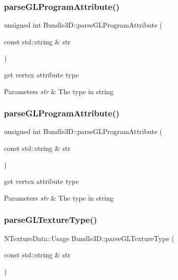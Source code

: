 \subsubsection{\texorpdfstring{parse\+G\+L\+Program\+Attribute()}{parseGLProgramAttribute()}\hspace{0.1cm}{\footnotesize\ttfamily [1/2]}}
{\footnotesize\ttfamily unsigned int Bundle3\+D\+::parse\+G\+L\+Program\+Attribute (\begin{DoxyParamCaption}\item[{const std\+::string \&}]{str }\end{DoxyParamCaption})\hspace{0.3cm}{\ttfamily [protected]}}

get vertex attribute type 
\begin{DoxyParams}{Parameters}
{\em str} & The type in string \\
\hline
\end{DoxyParams}
\mbox{\label{classBundle3D_a0a7ca57fdb38995fa753d07beffb7501}} 
\subsubsection{\texorpdfstring{parse\+G\+L\+Program\+Attribute()}{parseGLProgramAttribute()}\hspace{0.1cm}{\footnotesize\ttfamily [2/2]}}
{\footnotesize\ttfamily unsigned int Bundle3\+D\+::parse\+G\+L\+Program\+Attribute (\begin{DoxyParamCaption}\item[{const std\+::string \&}]{str }\end{DoxyParamCaption})\hspace{0.3cm}{\ttfamily [protected]}}

get vertex attribute type 
\begin{DoxyParams}{Parameters}
{\em str} & The type in string \\
\hline
\end{DoxyParams}
\mbox{\label{classBundle3D_a467d6b0c572920193acd43365a7300d2}} 
\subsubsection{\texorpdfstring{parse\+G\+L\+Texture\+Type()}{parseGLTextureType()}\hspace{0.1cm}{\footnotesize\ttfamily [1/2]}}
{\footnotesize\ttfamily N\+Texture\+Data\+::\+Usage Bundle3\+D\+::parse\+G\+L\+Texture\+Type (\begin{DoxyParamCaption}\item[{const std\+::string \&}]{str }\end{DoxyParamCaption})\hspace{0.3cm}{\ttfamily [protected]}}


